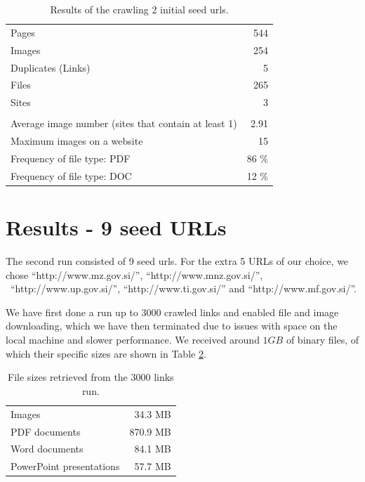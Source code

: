 \documentclass[9pt]{IEEEtran}
\begin{document}
\begin{table}[H]
    \begin{center}
    \caption{Results of the crawling 2 initial seed urls.}
        \begin{tabular}{ l | r }
        Pages & 544 \\
        Images & 254 \\
        Duplicates (Links) & 5 \\
        Files & 265 \\
        Sites & 3 \\
        \hline \\
        Average image number (sites that contain at least 1) & 2.91 \\
        Maximum images on a website & 15 \\
        Frequency of file type: PDF & 86 \% \\
        Frequency of file type: DOC & 12 \% \\
        \end{tabular}
    \label{tab:results2}
    \end{center}
\end{table}
\section{Results - 9 seed URLs}\label{sec:results2}
The second run consisted of 9 seed urls. 
For the extra 5 URLs of our choice, we chose ``http://www.mz.gov.si/'', ``http://www.mnz.gov.si/'', \ ``http://www.up.gov.si/'', ``http://www.ti.gov.si/'' and ``http://www.mf.gov.si/''. 

We have first done a run up to 3000 crawled links and enabled file and image downloading, which we have then terminated due to issues with space on the local machine and slower performance. We received around $1GB$ of binary files, of which their specific sizes are shown in Table \ref{tab:results_files}.

\begin{table}[H]
    \begin{center}
    \caption{File sizes retrieved from the 3000 links run.}
        \begin{tabular}{ l | r }
        Images & 34.3 MB \\
        PDF documents & 870.9 MB \\
        Word documents & 84.1 MB \\
        PowerPoint presentations & 57.7 MB \\
        \end{tabular}
    \label{tab:results_files}
    \end{center}
\end{table}
\end{document}
